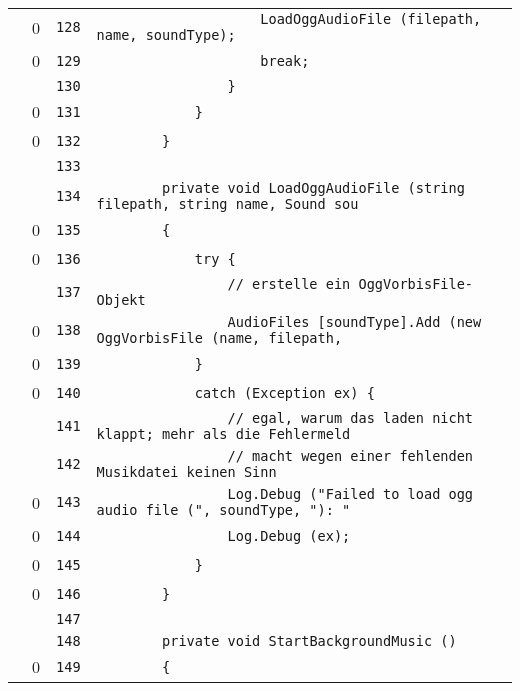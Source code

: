 \documentclass[a4paper,10pt]{article}
\begin{document}
\begin{longtable}[l]{lrrl}
\cellcolor{red} & 0 & \verb~128~ & \verb~                    LoadOggAudioFile (filepath, name, soundType);~\\
\cellcolor{red} & 0 & \verb~129~ & \verb~                    break;~\\
\cellcolor{gray} &  & \verb~130~ & \verb~                }~\\
\cellcolor{red} & 0 & \verb~131~ & \verb~            }~\\
\cellcolor{red} & 0 & \verb~132~ & \verb~        }~\\
\cellcolor{gray} &  & \verb~133~ & \verb~~\\
\cellcolor{gray} &  & \verb~134~ & \verb~        private void LoadOggAudioFile (string filepath, string name, Sound sou~\\
\cellcolor{red} & 0 & \verb~135~ & \verb~        {~\\
\cellcolor{red} & 0 & \verb~136~ & \verb~            try {~\\
\cellcolor{gray} &  & \verb~137~ & \verb~                // erstelle ein OggVorbisFile-Objekt~\\
\cellcolor{red} & 0 & \verb~138~ & \verb~                AudioFiles [soundType].Add (new OggVorbisFile (name, filepath,~\\
\cellcolor{red} & 0 & \verb~139~ & \verb~            }~\\
\cellcolor{red} & 0 & \verb~140~ & \verb~            catch (Exception ex) {~\\
\cellcolor{gray} &  & \verb~141~ & \verb~                // egal, warum das laden nicht klappt; mehr als die Fehlermeld~\\
\cellcolor{gray} &  & \verb~142~ & \verb~                // macht wegen einer fehlenden Musikdatei keinen Sinn~\\
\cellcolor{red} & 0 & \verb~143~ & \verb~                Log.Debug ("Failed to load ogg audio file (", soundType, "): "~\\
\cellcolor{red} & 0 & \verb~144~ & \verb~                Log.Debug (ex);~\\
\cellcolor{red} & 0 & \verb~145~ & \verb~            }~\\
\cellcolor{red} & 0 & \verb~146~ & \verb~        }~\\
\cellcolor{gray} &  & \verb~147~ & \verb~~\\
\cellcolor{gray} &  & \verb~148~ & \verb~        private void StartBackgroundMusic ()~\\
\cellcolor{red} & 0 & \verb~149~ & \verb~        {~\\

\end{longtable}
\end{document}
